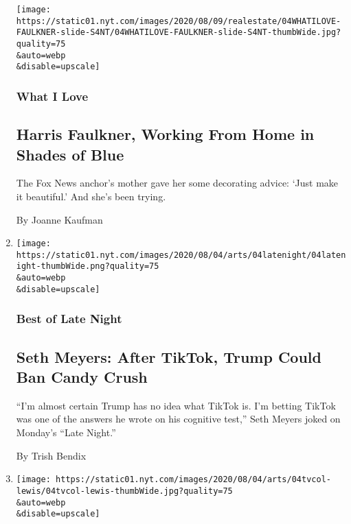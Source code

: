 \begin{enumerate}
  \texttt{[image: https://static01.nyt.com/images/2020/08/09/realestate/04WHATILOVE-FAULKNER-slide-S4NT/04WHATILOVE-FAULKNER-slide-S4NT-thumbWide.jpg?quality=75\\\&auto=webp\\\&disable=upscale]}

  \hypertarget{what-i-love}{%
  \subsubsection{What I Love}\label{what-i-love}}

  \hypertarget{harris-faulkner-working-from-home-in-shades-of-blue}{%
  \subsection{Harris Faulkner, Working From Home in Shades of
  Blue}\label{harris-faulkner-working-from-home-in-shades-of-blue}}

  The Fox News anchor's mother gave her some decorating advice: `Just
  make it beautiful.' And she's been trying.

  By Joanne Kaufman
\item
  \href{/2020/08/04/arts/television/seth-meyers-tiktok-trump.html}{}

  \texttt{[image: https://static01.nyt.com/images/2020/08/04/arts/04latenight/04latenight-thumbWide.png?quality=75\\\&auto=webp\\\&disable=upscale]}

  \hypertarget{best-of-late-night}{%
  \subsubsection{Best of Late Night}\label{best-of-late-night}}

  \hypertarget{seth-meyers-after-tiktok-trump-could-ban-candy-crush}{%
  \subsection{Seth Meyers: After TikTok, Trump Could Ban Candy
  Crush}\label{seth-meyers-after-tiktok-trump-could-ban-candy-crush}}

  ``I'm almost certain Trump has no idea what TikTok is. I'm betting
  TikTok was one of the answers he wrote on his cognitive test,'' Seth
  Meyers joked on Monday's ``Late Night.''

  By Trish Bendix
\item
  \href{/2020/08/04/arts/television/whats-on-tv-tuesday.html}{}

  \texttt{[image: https://static01.nyt.com/images/2020/08/04/arts/04tvcol-lewis/04tvcol-lewis-thumbWide.jpg?quality=75\\\&auto=webp\\\&disable=upscale]}


\end{enumerate}

